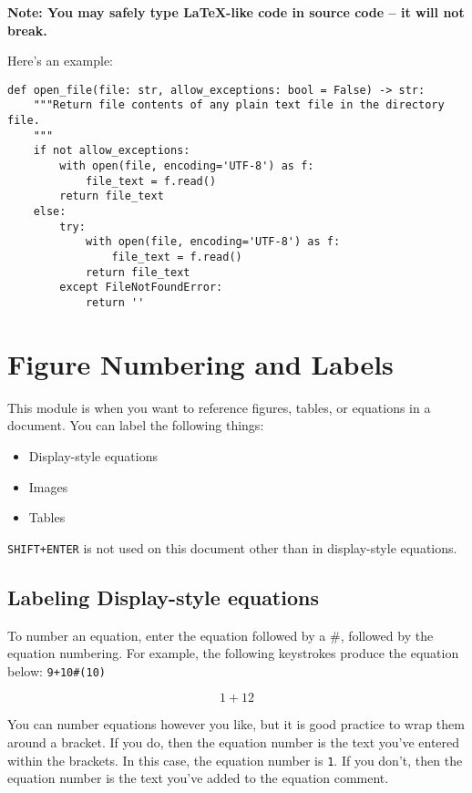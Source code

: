 \documentclass[
]{article}
\theoremstyle{plain}
\theoremstyle{remark}
\theoremstyle{definition}
\begin{document}
\textbf{Note: You may safely type LaTeX-like code in source code -- it
will not break.}

Here's an example:

\begin{verbatim}
def open_file(file: str, allow_exceptions: bool = False) -> str:
    """Return file contents of any plain text file in the directory file.
    """
    if not allow_exceptions:
        with open(file, encoding='UTF-8') as f:
            file_text = f.read()
        return file_text
    else:
        try:
            with open(file, encoding='UTF-8') as f:
                file_text = f.read()
            return file_text
        except FileNotFoundError:
            return ''
\end{verbatim}


\section{Figure Numbering and
Labels}

This module is when you want to reference figures, tables, or equations
in a document. You can label the following things:

\begin{itemize}
\item
  Display-style equations
\item
  Images
\item
  Tables
\end{itemize}

\texttt{SHIFT+ENTER} is not used on this document other than in
display-style equations.


\subsection{Labeling Display-style
equations}

To number an equation, enter the equation followed by a \#, followed by
the equation numbering. For example, the following keystrokes produce
the equation below: \texttt{9+10\#(10)}


\begin{equation}
1 + 12\tag{1} \label{eq:1}
\end{equation}


You can number equations however you like, but it is good practice to
wrap them around a bracket. If you do, then the equation number is the
text you've entered within the brackets. In this case, the equation
number is \texttt{1}. If you don't, then the equation number is the text
you've added to the equation comment.
\end{document}
